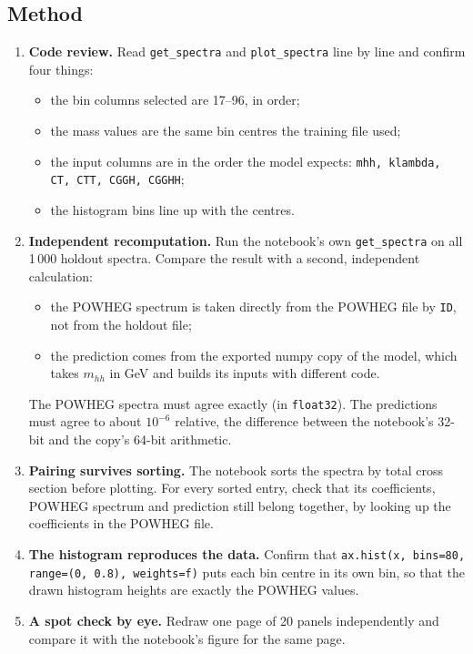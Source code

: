 \documentclass[11pt]{article}
\newcommand{\code}[1]{\texttt{#1}}
\newcommand{\mhh}{m_{hh}}
\begin{document}
\subsection{Method}
\begin{enumerate}[label=\textbf{3\alph*.}]
  \item \textbf{Code review.} Read \code{get\_spectra} and \code{plot\_spectra}
  line by line and confirm four things:
  \begin{itemize}
    \item the bin columns selected are 17--96, in order;
    \item the mass values are the same bin centres the training file used;
    \item the input columns are in the order the model expects:
    \code{mhh, klambda, CT, CTT, CGGH, CGGHH};
    \item the histogram bins line up with the centres.
  \end{itemize}
  \item \textbf{Independent recomputation.} Run the notebook's own
  \code{get\_spectra} on all 1\,000 holdout spectra. Compare the result with a
  second, independent calculation:
  \begin{itemize}
    \item the POWHEG spectrum is taken directly from the POWHEG file by \code{ID},
    not from the holdout file;
    \item the prediction comes from the exported numpy copy of the model, which
    takes $\mhh$ in GeV and builds its inputs with different code.
  \end{itemize}
  The POWHEG spectra must agree exactly (in \code{float32}). The predictions must
  agree to about $10^{-6}$ relative, the difference between the notebook's 32-bit
  and the copy's 64-bit arithmetic.
  \item \textbf{Pairing survives sorting.} The notebook sorts the spectra by total
  cross section before plotting. For every sorted entry, check that its
  coefficients, POWHEG spectrum and prediction still belong together, by looking up
  the coefficients in the POWHEG file.
  \item \textbf{The histogram reproduces the data.} Confirm that
  \code{ax.hist(x, bins=80, range=(0, 0.8), weights=f)} puts each bin centre in its
  own bin, so that the drawn histogram heights are exactly the POWHEG values.
  \item \textbf{A spot check by eye.} Redraw one page of 20 panels independently
  and compare it with the notebook's figure for the same page.
\end{enumerate}
\end{document}
